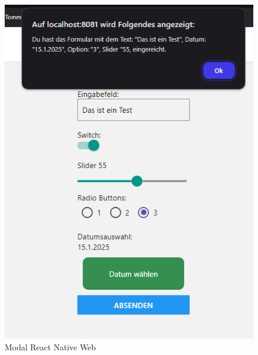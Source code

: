 \begin{figure}[H]
    \begin{minipage}{0.45\textwidth}
        \centering
        \includegraphics[width=\linewidth]{images/form/web/react_native/modal.png}
        \caption{Modal React Native Web}
    \end{minipage}
    \hfill
    \begin{minipage}{0.45\textwidth}
        \centering

\end{minipage}
\end{figure}
